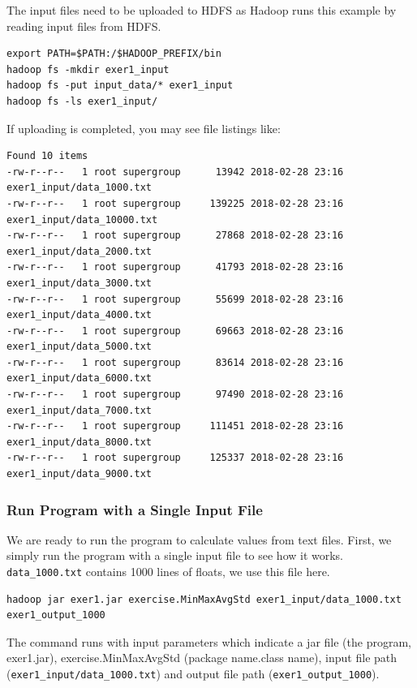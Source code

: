 The input files need to be uploaded to HDFS as Hadoop runs this example by
reading input files from HDFS.

\begin{lstlisting}
export PATH=$PATH:/$HADOOP_PREFIX/bin
hadoop fs -mkdir exer1_input
hadoop fs -put input_data/* exer1_input
hadoop fs -ls exer1_input/
\end{lstlisting}

If uploading is completed, you may see file listings like:

\begin{lstlisting}
Found 10 items
-rw-r--r--   1 root supergroup      13942 2018-02-28 23:16 exer1_input/data_1000.txt
-rw-r--r--   1 root supergroup     139225 2018-02-28 23:16 exer1_input/data_10000.txt
-rw-r--r--   1 root supergroup      27868 2018-02-28 23:16 exer1_input/data_2000.txt
-rw-r--r--   1 root supergroup      41793 2018-02-28 23:16 exer1_input/data_3000.txt
-rw-r--r--   1 root supergroup      55699 2018-02-28 23:16 exer1_input/data_4000.txt
-rw-r--r--   1 root supergroup      69663 2018-02-28 23:16 exer1_input/data_5000.txt
-rw-r--r--   1 root supergroup      83614 2018-02-28 23:16 exer1_input/data_6000.txt
-rw-r--r--   1 root supergroup      97490 2018-02-28 23:16 exer1_input/data_7000.txt
-rw-r--r--   1 root supergroup     111451 2018-02-28 23:16 exer1_input/data_8000.txt
-rw-r--r--   1 root supergroup     125337 2018-02-28 23:16 exer1_input/data_9000.txt
\end{lstlisting}

\subsubsection{Run Program with a Single Input File}

We are ready to run the program to calculate values from text
files. First, we simply run the program with a single input file to
see how it works.  \verb|data_1000.txt| contains 1000 lines of
floats, we use this file here.

\begin{lstlisting}
hadoop jar exer1.jar exercise.MinMaxAvgStd exer1_input/data_1000.txt exer1_output_1000
\end{lstlisting}

The command runs with input parameters which indicate a jar file (the
program, exer1.jar), exercise.MinMaxAvgStd (package name.class name),
input file path (\verb|exer1_input/data_1000.txt|) and output file path
(\verb|exer1_output_1000|).

